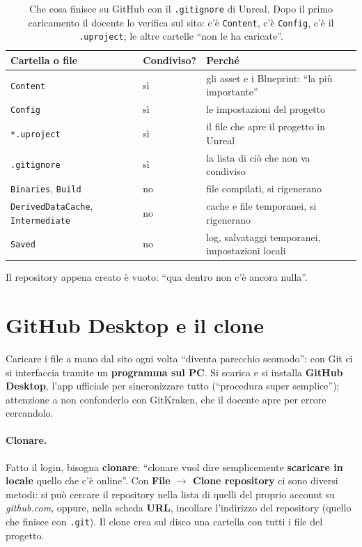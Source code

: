 \begin{table}[htbp]
\centering
\small
\begin{tabular}{p{3.3cm}p{2.4cm}p{7.2cm}}
\toprule
\textbf{Cartella o file} & \textbf{Condiviso?} & \textbf{Perché}\\
\midrule
\texttt{Content} & sì & gli asset e i Blueprint: ``la più importante''\\
\texttt{Config} & sì & le impostazioni del progetto\\
\texttt{*.uproject} & sì & il file che apre il progetto in Unreal\\
\texttt{.gitignore} & sì & la lista di ciò che non va condiviso\\
\texttt{Binaries}, \texttt{Build} & no & file compilati, si rigenerano\\
\texttt{DerivedDataCache}, \texttt{Intermediate} & no & cache e file
temporanei, si rigenerano\\
\texttt{Saved} & no & log, salvataggi temporanei, impostazioni locali\\
\bottomrule
\end{tabular}
\caption{Che cosa finisce su GitHub con il \texttt{.gitignore} di Unreal. Dopo
il primo caricamento il docente lo verifica sul sito: c'è \texttt{Content}, c'è
\texttt{Config}, c'è il \texttt{.uproject}; le altre cartelle ``non le ha
caricate''.}
\label{gd13:tab:gitignore}
\end{table}

Il repository appena creato è vuoto: ``qua dentro non c'è ancora nulla''.

\section{GitHub Desktop e il clone}
\label{gd13:sec:desktop}

Caricare i file a mano dal sito ogni volta ``diventa parecchio scomodo'': con
Git ci si interfaccia tramite un \textbf{programma sul PC}. Si scarica e si
installa \textbf{GitHub Desktop}, l'app ufficiale per sincronizzare tutto
(``procedura super semplice''); attenzione a non confonderlo con GitKraken,
che il docente apre per errore cercandolo.

\paragraph{Clonare.} Fatto il login, bisogna \textbf{clonare}: ``clonare vuol
dire semplicemente \textbf{scaricare in locale} quello che c'è online''. Con
\textbf{File $\rightarrow$ Clone repository} ci sono diversi metodi: si può
cercare il repository nella lista di quelli del proprio account su
\emph{github.com}, oppure, nella scheda \textbf{URL}, incollare l'indirizzo
del repository (quello che finisce con \texttt{.git}). Il clone crea sul disco
una cartella con tutti i file del progetto.

